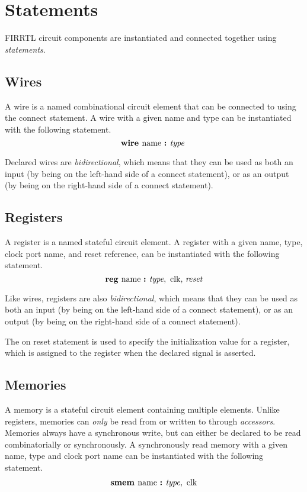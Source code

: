 \documentclass[12pt]{article}
\begin{document}
\section{Statements} \label{statements}

FIRRTL circuit components are instantiated and connected together using {\em statements}.

\subsection{Wires}
A wire is a named combinational circuit element that can be connected to using the connect statement.
A wire with a given name and type can be instantiated with the following statement.
\[
\text{\bf wire\ } \text{name } \text{\bf :\ } \text{\em type\ } \\
\]

Declared wires are {\em bidirectional}, which means that they can be used as both an input (by being on the left-hand side of a connect statement), or as an output (by being on the right-hand side of a connect statement).

\subsection{Registers}
A register is a named stateful circuit element.
A register with a given name, type, clock port name, and reset reference, can be instantiated with the following statement.
\[
\text{\bf reg\ } \text{name } \text{\bf :\ } \text{\em type},\text{ clk, } \text{\em reset} \\
\]

Like wires, registers are also {\em bidirectional}, which means that they can be used as both an input (by being on the left-hand side of a connect statement), or as an output (by being on the right-hand side of a connect statement). 

The on reset statement is used to specify the initialization value for a register, which is assigned to the register when the declared  signal is asserted.

\subsection{Memories}
A memory is a stateful circuit element containing multiple elements.
Unlike registers, memories can {\em only} be read from or written to through {\em accessors}.
Memories always have a synchronous write, but can either be declared to be read combinatorially or synchronously.
A synchronously read memory with a given name, type and clock port name can be instantiated with the following statement.
\[
\begin{aligned}
\text{\bf smem\ } \text{name } \text{\bf :\ } \text{\em type},\text{ clk} \\
\end{aligned}
\]
\end{document}
